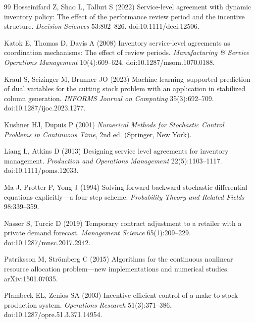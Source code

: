 \documentclass[11pt,letterpaper]{article}
\theoremstyle{definition}
\newcommand{\1}{\mathbf 1}
\begin{document}
\begin{thebibliography}{99}
Hosseinifard Z, Shao L, Talluri S (2022) Service-level agreement with dynamic inventory policy: The effect of the performance review period and the incentive structure. \emph{Decision Sciences} 53:802--826. doi:10.1111/deci.12506.

Katok E, Thomas D, Davis A (2008) Inventory service-level agreements as coordination mechanisms: The effect of review periods. \emph{Manufacturing \& Service Operations Management} 10(4):609--624. doi:10.1287/msom.1070.0188.

Kraul S, Seizinger M, Brunner JO (2023) Machine learning--supported prediction of dual variables for the cutting stock problem with an application in stabilized column generation. \emph{INFORMS Journal on Computing} 35(3):692--709. doi:10.1287/ijoc.2023.1277.

Kushner HJ, Dupuis P (2001) \emph{Numerical Methods for Stochastic Control Problems in Continuous Time}, 2nd ed. (Springer, New York).

Liang L, Atkins D (2013) Designing service level agreements for inventory management. \emph{Production and Operations Management} 22(5):1103--1117. doi:10.1111/poms.12033.

Ma J, Protter P, Yong J (1994) Solving forward-backward stochastic differential equations explicitly---a four step scheme. \emph{Probability Theory and Related Fields} 98:339--359.

Nasser S, Turcic D (2019) Temporary contract adjustment to a retailer with a private demand forecast. \emph{Management Science} 65(1):209--229. doi:10.1287/mnsc.2017.2942.


Patriksson M, Str\"omberg C (2015) Algorithms for the continuous nonlinear resource allocation problem---new implementations and numerical studies. arXiv:1501.07035.

Plambeck EL, Zenios SA (2003) Incentive efficient control of a make-to-stock production system. \emph{Operations Research} 51(3):371--386. doi:10.1287/opre.51.3.371.14954.


\end{thebibliography}
\end{document}
